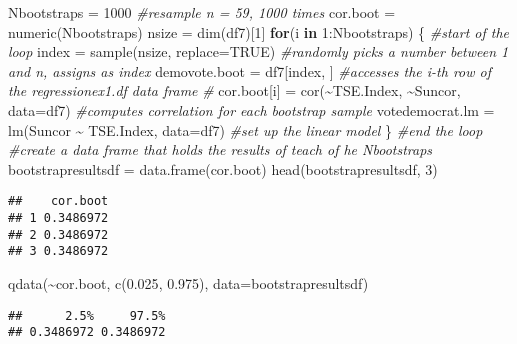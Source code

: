 \documentclass[
]{article}
\newenvironment{Shaded}{\begin{snugshade}}{\end{snugshade}}
\newcommand{\AttributeTok}[1]{\textcolor[rgb]{0.77,0.63,0.00}{#1}}
\newcommand{\CommentTok}[1]{\textcolor[rgb]{0.56,0.35,0.01}{\textit{#1}}}
\newcommand{\ConstantTok}[1]{\textcolor[rgb]{0.00,0.00,0.00}{#1}}
\newcommand{\ControlFlowTok}[1]{\textcolor[rgb]{0.13,0.29,0.53}{\textbf{#1}}}
\newcommand{\DecValTok}[1]{\textcolor[rgb]{0.00,0.00,0.81}{#1}}
\newcommand{\FloatTok}[1]{\textcolor[rgb]{0.00,0.00,0.81}{#1}}
\newcommand{\FunctionTok}[1]{\textcolor[rgb]{0.00,0.00,0.00}{#1}}
\newcommand{\NormalTok}[1]{#1}
\newcommand{\OtherTok}[1]{\textcolor[rgb]{0.56,0.35,0.01}{#1}}
\newcommand{\SpecialCharTok}[1]{\textcolor[rgb]{0.00,0.00,0.00}{#1}}
\begin{document}
\begin{Shaded}
\begin{Highlighting}[]
\NormalTok{Nbootstraps }\OtherTok{=} \DecValTok{1000} \CommentTok{\#resample n =  59, 1000 times}
\NormalTok{cor.boot }\OtherTok{=} \FunctionTok{numeric}\NormalTok{(Nbootstraps)}
\NormalTok{nsize }\OtherTok{=} \FunctionTok{dim}\NormalTok{(df7)[}\DecValTok{1}\NormalTok{]}
\ControlFlowTok{for}\NormalTok{(i }\ControlFlowTok{in} \DecValTok{1}\SpecialCharTok{:}\NormalTok{Nbootstraps)}
\NormalTok{\{   }\CommentTok{\#start of the loop}
\NormalTok{    index }\OtherTok{=} \FunctionTok{sample}\NormalTok{(nsize, }\AttributeTok{replace=}\ConstantTok{TRUE}\NormalTok{)  }\CommentTok{\#randomly picks a number between 1 and n, assigns as index}
\NormalTok{    demovote.boot }\OtherTok{=}\NormalTok{ df7[index, ] }\CommentTok{\#accesses the i{-}th row of the regressionex1.df data frame}
    \CommentTok{\#}
\NormalTok{    cor.boot[i] }\OtherTok{=} \FunctionTok{cor}\NormalTok{(}\SpecialCharTok{\textasciitilde{}}\NormalTok{TSE.Index, }\SpecialCharTok{\textasciitilde{}}\NormalTok{Suncor, }\AttributeTok{data=}\NormalTok{df7) }\CommentTok{\#computes correlation for each bootstrap sample}
\NormalTok{    votedemocrat.lm }\OtherTok{=} \FunctionTok{lm}\NormalTok{(Suncor }\SpecialCharTok{\textasciitilde{}}\NormalTok{ TSE.Index, }\AttributeTok{data=}\NormalTok{df7)  }\CommentTok{\#set up the linear model}
\NormalTok{\}}
\CommentTok{\#end the loop}
\CommentTok{\#create a data frame that holds the results of teach of he Nbootstraps }
\NormalTok{bootstrapresultsdf }\OtherTok{=} \FunctionTok{data.frame}\NormalTok{(cor.boot)}
\FunctionTok{head}\NormalTok{(bootstrapresultsdf, }\DecValTok{3}\NormalTok{)}
\end{Highlighting}
\end{Shaded}

\begin{verbatim}
##    cor.boot
## 1 0.3486972
## 2 0.3486972
## 3 0.3486972
\end{verbatim}

\begin{Shaded}
\begin{Highlighting}[]
\FunctionTok{qdata}\NormalTok{(}\SpecialCharTok{\textasciitilde{}}\NormalTok{cor.boot, }\FunctionTok{c}\NormalTok{(}\FloatTok{0.025}\NormalTok{, }\FloatTok{0.975}\NormalTok{), }\AttributeTok{data=}\NormalTok{bootstrapresultsdf)}
\end{Highlighting}
\end{Shaded}

\begin{verbatim}
##      2.5%     97.5% 
## 0.3486972 0.3486972
\end{verbatim}
\end{document}
